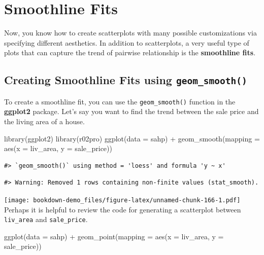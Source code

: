 \documentclass[
]{book}
\newenvironment{Shaded}{\begin{snugshade}}{\end{snugshade}}
\newcommand{\AttributeTok}[1]{\textcolor[rgb]{0.77,0.63,0.00}{#1}}
\newcommand{\FunctionTok}[1]{\textcolor[rgb]{0.00,0.00,0.00}{#1}}
\newcommand{\NormalTok}[1]{#1}
\newcommand{\SpecialCharTok}[1]{\textcolor[rgb]{0.00,0.00,0.00}{#1}}
\begin{document}
\hypertarget{smoothline}{%
\section{Smoothline Fits}\label{smoothline}}

Now, you know how to create scatterplots with many possible customizations via specifying different aesthetics. In addition to scatterplots, a very useful type of plots that can capture the trend of pairwise relationship is the \textbf{smoothline fits}.

\hypertarget{creating-smoothline-fits-using-geom_smooth}{%
\subsection{\texorpdfstring{Creating Smoothline Fits using \texttt{geom\_smooth()}}{Creating Smoothline Fits using geom\_smooth()}}\label{creating-smoothline-fits-using-geom_smooth}}

To create a smoothline fit, you can use the \texttt{geom\_smooth()} function in the \textbf{ggplot2} package. Let's say you want to find the trend between the sale price and the living area of a house.

\begin{Shaded}
\begin{Highlighting}[]
\FunctionTok{library}\NormalTok{(ggplot2)}
\FunctionTok{library}\NormalTok{(r02pro)}
\FunctionTok{ggplot}\NormalTok{(}\AttributeTok{data =}\NormalTok{ sahp) }\SpecialCharTok{+} \FunctionTok{geom\_smooth}\NormalTok{(}\AttributeTok{mapping =} \FunctionTok{aes}\NormalTok{(}\AttributeTok{x =}\NormalTok{ liv\_area, }\AttributeTok{y =}\NormalTok{ sale\_price))}
\end{Highlighting}
\end{Shaded}

\begin{verbatim}
#> `geom_smooth()` using method = 'loess' and formula 'y ~ x'
\end{verbatim}

\begin{verbatim}
#> Warning: Removed 1 rows containing non-finite values (stat_smooth).
\end{verbatim}

\texttt{[image: bookdown-demo\_files/figure-latex/unnamed-chunk-166-1.pdf]}
Perhaps it is helpful to review the code for generating a scatterplot between \texttt{liv\_area} and \texttt{sale\_price}.

\begin{Shaded}
\begin{Highlighting}[]
\FunctionTok{ggplot}\NormalTok{(}\AttributeTok{data =}\NormalTok{ sahp) }\SpecialCharTok{+} \FunctionTok{geom\_point}\NormalTok{(}\AttributeTok{mapping =} \FunctionTok{aes}\NormalTok{(}\AttributeTok{x =}\NormalTok{ liv\_area, }\AttributeTok{y =}\NormalTok{ sale\_price))}
\end{Highlighting}
\end{Shaded}
\end{document}
